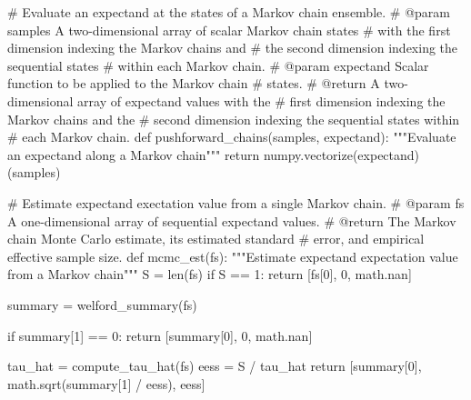 \documentclass[
  letterpaper,
  DIV=11,
  numbers=noendperiod]{scrartcl}
\newenvironment{Shaded}{\begin{snugshade}}{\end{snugshade}}
\newcommand{\BuiltInTok}[1]{\textcolor[rgb]{0.00,0.23,0.31}{#1}}
\newcommand{\CommentTok}[1]{\textcolor[rgb]{0.37,0.37,0.37}{#1}}
\newcommand{\ControlFlowTok}[1]{\textcolor[rgb]{0.00,0.23,0.31}{#1}}
\newcommand{\DecValTok}[1]{\textcolor[rgb]{0.68,0.00,0.00}{#1}}
\newcommand{\KeywordTok}[1]{\textcolor[rgb]{0.00,0.23,0.31}{#1}}
\newcommand{\NormalTok}[1]{\textcolor[rgb]{0.00,0.23,0.31}{#1}}
\newcommand{\OperatorTok}[1]{\textcolor[rgb]{0.37,0.37,0.37}{#1}}
\begin{document}
\begin{Shaded}
\begin{Highlighting}[]
\CommentTok{\# Evaluate an expectand at the states of a Markov chain ensemble.}
\CommentTok{\# @param samples A two{-}dimensional array of scalar Markov chain states }
\CommentTok{\#                with the first dimension indexing the Markov chains and }
\CommentTok{\#                the second dimension indexing the sequential states }
\CommentTok{\#                within each Markov chain.}
\CommentTok{\# @param expectand Scalar function to be applied to the Markov chain }
\CommentTok{\#                  states.}
\CommentTok{\# @return A two{-}dimensional array of expectand values with the }
\CommentTok{\#         first dimension indexing the Markov chains and the }
\CommentTok{\#         second dimension indexing the sequential states within }
\CommentTok{\#         each Markov chain.}
\KeywordTok{def}\NormalTok{ pushforward\_chains(samples, expectand):}
  \CommentTok{"""Evaluate an expectand along a Markov chain"""}
  \ControlFlowTok{return}\NormalTok{ numpy.vectorize(expectand)(samples)}

\CommentTok{\# Estimate expectand exectation value from a single Markov chain.}
\CommentTok{\# @param fs A one{-}dimensional array of sequential expectand values.}
\CommentTok{\# @return The Markov chain Monte Carlo estimate, its estimated standard }
\CommentTok{\#         error, and empirical effective sample size.}
\KeywordTok{def}\NormalTok{ mcmc\_est(fs):}
  \CommentTok{"""Estimate expectand expectation value from a Markov chain"""}
\NormalTok{  S }\OperatorTok{=} \BuiltInTok{len}\NormalTok{(fs)}
  \ControlFlowTok{if}\NormalTok{ S }\OperatorTok{==} \DecValTok{1}\NormalTok{:}
    \ControlFlowTok{return}\NormalTok{ [fs[}\DecValTok{0}\NormalTok{], }\DecValTok{0}\NormalTok{, math.nan]}
  
\NormalTok{  summary }\OperatorTok{=}\NormalTok{ welford\_summary(fs)}
  
  \ControlFlowTok{if}\NormalTok{ summary[}\DecValTok{1}\NormalTok{] }\OperatorTok{==} \DecValTok{0}\NormalTok{:}
    \ControlFlowTok{return}\NormalTok{ [summary[}\DecValTok{0}\NormalTok{], }\DecValTok{0}\NormalTok{, math.nan]}
  
\NormalTok{  tau\_hat }\OperatorTok{=}\NormalTok{ compute\_tau\_hat(fs)}
\NormalTok{  eess }\OperatorTok{=}\NormalTok{ S }\OperatorTok{/}\NormalTok{ tau\_hat}
  \ControlFlowTok{return}\NormalTok{ [summary[}\DecValTok{0}\NormalTok{], math.sqrt(summary[}\DecValTok{1}\NormalTok{] }\OperatorTok{/}\NormalTok{ eess), eess]}


\end{Highlighting}
\end{Shaded}
\end{document}
